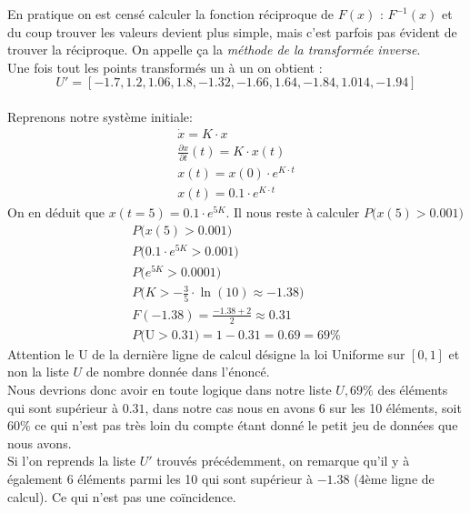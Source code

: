 \documentclass[11pt,a4paper]{report}
\begin{document}
			En pratique on est censé calculer la fonction réciproque de $F(x)$ : $F^{-1}(x)$ et du coup trouver les valeurs devient plus simple, mais c'est parfois pas évident de trouver la réciproque. On appelle ça la \emph{méthode de la transformée inverse}.\\
			
			Une fois tout les points transformés un à un on obtient : 
			\[
				U' = [-1.7, 1.2, 1.06, 1.8, -1.32, -1.66, 1.64, -1.84, 1.014, -1.94]
			\]\\
			
			Reprenons notre système initiale:
			\begin{gather*}
					\dot{x} = K \cdot x\\
					\frac{\partial x}{\partial t} (t) = K \cdot x(t)\\
					x(t) = x(0) \cdot e^{K \cdot t}\\
					x(t) = 0.1 \cdot e^{K \cdot t}	
			\end{gather*}
			On en déduit que $x(t=5) = 0.1 \cdot e^{5K} $. Il nous reste à calculer $P\big(x(5) > 0.001\big)$
			\begin{gather*}
					P\big(x(5) > 0.001\big)\\
					P\big(0.1 \cdot e^{5K} > 0.001\big)\\		
					P\big(e^{5K} > 0.0001\big)\\
					P\big(K > -\frac{3}{5} \cdot \ln(10) \approx -1.38\big)	\\
					F(-1.38) = 	\frac{-1.38 + 2}{2} \approx 0.31\\
					P\big( \text{U} > 0.31 \big) = 1-0.31 = 0.69 =69\%		
			\end{gather*}
			Attention le U de la dernière ligne de calcul désigne la loi Uniforme sur $[0, 1]$ et non la liste $U$ de nombre donnée dans l'énoncé.\\
			
			Nous devrions donc avoir en toute logique dans notre liste $U, 69\%$ des éléments qui sont supérieur à $0.31$, dans notre cas nous en avons 6 sur les 10 éléments, soit $60\%$ ce qui n'est pas très loin du compte étant donné le petit jeu de données que nous avons.\\
			Si l'on reprends la liste $U'$ trouvés précédemment, on remarque qu'il y à également 6 éléments parmi les 10 qui sont supérieur à $-1.38$ (4ème ligne de calcul). Ce qui n'est pas une coïncidence.

			
			
	
\end{document}
